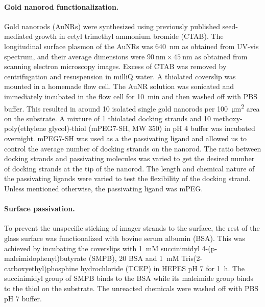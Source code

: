 \paragraph*{Gold nanorod functionalization.} Gold nanorods (AuNRs) were synthesized using previously published seed-mediated growth in cetyl trimethyl ammonium bromide (CTAB). \cite{nikoobakht2003preparation}
The longitudinal surface plasmon of the AuNRs was \SI{640}{\nm} as obtained from UV-vis spectrum, and their average dimensions were $\SI{90}{\nm}\times\SI{45}{\nm}$ as obtained from scanning electron microscopy images.
Excess of CTAB was removed by centrifugation and resuspension in milliQ water.
A thiolated coverslip was mounted in a homemade flow cell.
The AuNR solution was sonicated and immediately incubated in the flow cell for 10~min and then washed off with PBS buffer.
This resulted in around 10 isolated single gold nanorods per \SI{100}{\um\squared} area on the substrate.
A mixture of \SI{1}{\nM} thiolated docking strands and \SI{10}{\uM} methoxy-poly(ethylene glycol)-thiol (mPEG7-SH, MW 350) in pH 4 buffer was incubated overnight.
mPEG7-SH was used as a the passivating ligand and allowed us to control the average number of docking strands on the nanorod.
The ratio between docking strands and passivating molecules was varied to get the desired number of docking strands at the tip of the nanorod.
The length and chemical nature of the passivating ligands were varied to test the flexibility of the docking strand.
Unless mentioned otherwise, the passivating ligand was mPEG.


\paragraph*{Surface passivation.} To prevent the unspecific sticking of imager strands to the surface, the rest of the glass surface was functionalized with bovine serum albumin (BSA).
This was achieved by incubating the coverslips with \SI{1}{mM} succinimidyl 4-(p-maleimidophenyl)butyrate (SMPB), \SI{20}{\uM} BSA and \SI{1}{mM} Tris(2-carboxyethyl)phosphine hydrochloride (TCEP) in HEPES pH 7 for \SI{1}{\hour}.
The succinimidyl group of SMPB binds to the BSA while its maleimide group binds to the thiol on the substrate. 
The unreacted chemicals were washed off with PBS pH 7 buffer.


